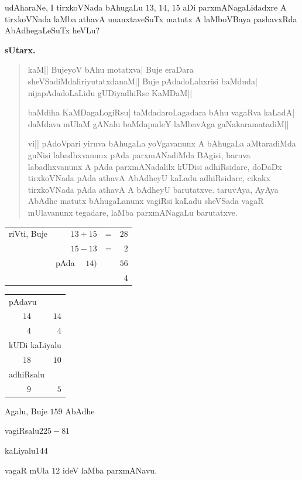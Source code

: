 udAharaNe, I tirxkoVNada bAhugaLu $13$, $14$, $15$ aDi
parxmANagaLidadxre A tirxkoVNada laMba athavA unanxtaveSuTx matutx A
laMboVBaya pashavxRda AbAdhegaLeSuTx heVLu?

\medskip
\begin{center}
{\large\bf sUtarx.}
\end{center}

\begin{verse}
kaM|| BujeyoV bAhu motatxva| Buje eraDara sheVSadiMdaliriyutatxdanaM||
Buje pAdadoLahxrisi baMduda| nijapAdadoLaLidu gUDiyadhiRse KaMDaM||

baMdiha KaMDagaLogiRsu| taMdadaroLagadara bAhu vagaRva kaLadA| daMdava
mUlaM gANalu baMdapudeY laMbavAga gaNakaramatadiM||

vi|| pAdoVpari yiruva bAhugaLa yoVgavanunx A bAhugaLa aMtaradiMda
guNisi labadhxvanunx pAda parxmANadiMda BAgisi, baruva labadhxvanunx A
pAda parxmANadalilx kUDisi adhiRsidare, doDaDx tirxkoVNada pAda athavA
AbAdheyU kaLadu adhiRsidare, cikakx tirxkoVNada pAda athavA A bAdheyU
barutatxve. taruvAya, AyAya AbAdhe matutx bAhugaLanunx vagiRsi kaLadu
sheVSada vagaR mUlavanunx tegadare, laMba parxmANagaLu barutatxve. 
\end{verse}

\medskip

\begin{tabular}{rrcr}
riVti, Buje & $13+15$ & = & $28$\\
            & $15-13$ & = & $2$\\
\cline{4-4}
 & pAda~~ $14)$ && $56$\\
\cline{4-4}
& & & $4$
\end{tabular}

\medskip

\begin{tabular}{rr}
\multicolumn{2}{l}{pAdavu}\\[2pt]
$14$ & $14$\\
$4$ & $4$\\[5pt]
\multicolumn{2}{l}{kUDi kaLiyalu}\\[2pt]
$18$ & $10$\\[5pt]
\multicolumn{2}{l}{adhiRsalu}\\[2pt]
$9$ & $5$
\end{tabular}

Agalu, Buje $15$\qquad $9$ AbAdhe

vagiRsalu\quad $225-81$

kaLiyalu\quad $144$

vagaR mUla $12$ ideV laMba parxmANavu.

